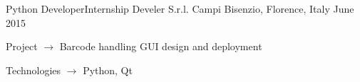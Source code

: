 \begin{cventries}
  \cventry
    {Python Developer{\enskip\cdotp\enskip}Internship}
    {Develer S.r.l.}
    {Campi Bisenzio, Florence, Italy}
    {June 2015}
    {
      \begin{cvitems}
        \item {Project $\rightarrow$ Barcode handling GUI design and deployment}
        \item {Technologies $\rightarrow$ Python, Qt}
      \end{cvitems}
    }

\end{cventries}
